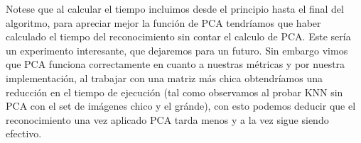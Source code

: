 Notese que al calcular el tiempo incluimos desde el principio hasta el final del algoritmo, para apreciar mejor la función de PCA tendríamos que haber calculado el tiempo del reconocimiento sin contar el calculo de PCA. Este sería un experimento interesante, que dejaremos para un futuro.\newline
Sin embargo vimos que PCA funciona correctamente en cuanto a nuestras métricas y por nuestra implementación, al trabajar con una matriz más chica obtendríamos una reducción en el tiempo de ejecución (tal como observamos al probar KNN sin PCA con el set de imágenes chico y el gránde), con esto podemos deducir que el reconocimiento una vez aplicado PCA tarda menos y a la vez sigue siendo efectivo.


